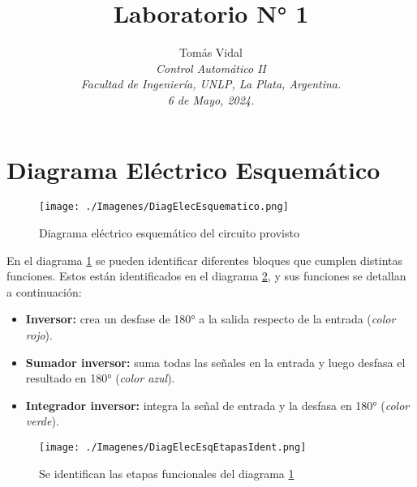 \documentclass[letterpaper, 10 pt, conference]{ieeeconf}  %
\title{\LARGE \bf Laboratorio N° 1}
\author{
  Tom\'as Vidal\\
  {\it Control Automático II}\\
  {\it Facultad de Ingenier\'ia, UNLP, La Plata, Argentina.}\\
  {\it 6 de Mayo, 2024.}
}                                            %
\begin{document}
\maketitle
\thispagestyle{empty}
\pagestyle{empty}

\section{Diagrama Eléctrico Esquemático}
\begin{figure}[H]
  \centering
  \texttt{[image: ./Imagenes/DiagElecEsquematico.png]}
  \caption{Diagrama eléctrico esquemático del circuito provisto}
  \label{fig:diag_elect_esq}
\end{figure}

En el diagrama \ref{fig:diag_elect_esq} se pueden identificar diferentes bloques que cumplen distintas funciones. Estos están identificados en el diagrama \ref{fig:diag_elec_esq_etapas}, y sus funciones se detallan a continuación:
\begin{itemize}
  \item \textbf{Inversor:} crea un desfase de \ang{180} a la salida respecto de la entrada (\textit{color rojo}).
  \item \textbf{Sumador inversor:} suma todas las señales en la entrada y luego desfasa el resultado en \ang{180} (\textit{color azul}).
  \item \textbf{Integrador inversor:} integra la señal de entrada y la desfasa en \ang{180}  (\textit{color verde}).
\end{itemize}
\begin{figure}[H]
  \centering
  \texttt{[image: ./Imagenes/DiagElecEsqEtapasIdent.png]}
  \caption{Se identifican las etapas funcionales del diagrama \ref{fig:diag_elect_esq}}
  \label{fig:diag_elec_esq_etapas}
\end{figure}
\end{document}
